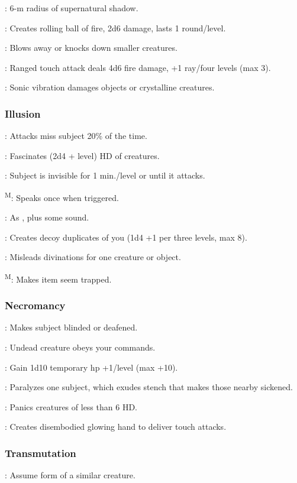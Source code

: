 	: 6-m radius of supernatural shadow.

	: Creates rolling ball of fire, 2d6 damage, lasts 1 round/level.

	: Blows away or knocks down smaller creatures.

	: Ranged touch attack deals 4d6 fire damage, +1 ray/four levels (max 3).

	: Sonic vibration damages objects or crystalline creatures.

\subsubsection{Illusion}
	: Attacks miss subject 20\% of the time.

	: Fascinates (2d4 + level) HD of creatures.

	: Subject is invisible for 1 min./level or until it attacks.

	\textsuperscript{M}: Speaks once when triggered.

	: As , plus some sound.

	: Creates decoy duplicates of you (1d4 +1 per three levels, max 8).

	: Misleads divinations for one creature or object.

	\textsuperscript{M}: Makes item seem trapped.

\subsubsection{Necromancy}
	: Makes subject blinded or deafened.

	: Undead creature obeys your commands.

	: Gain 1d10 temporary hp +1/level (max +10).

	: Paralyzes one subject, which exudes stench that makes those nearby sickened.

	: Panics creatures of less than 6 HD.

	: Creates disembodied glowing hand to deliver touch attacks.

\subsubsection{Transmutation}
	: Assume form of a similar creature.


